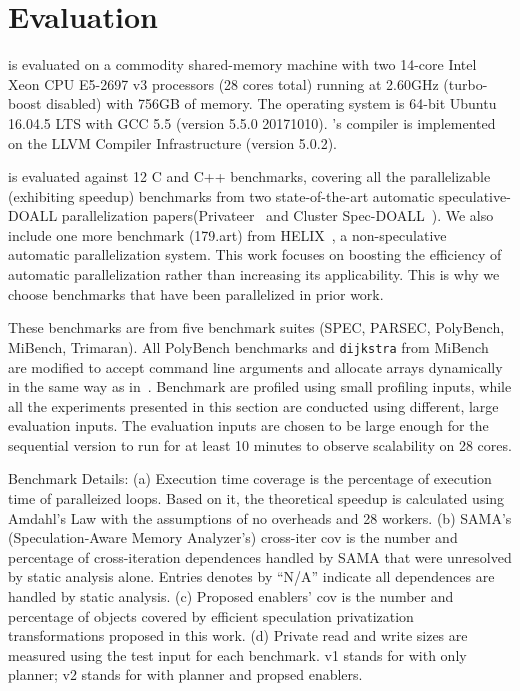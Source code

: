 \section{Evaluation}
\label{eval}
\name is evaluated on a commodity shared-memory machine with two 14-core
Intel Xeon CPU E5-2697 v3 processors (28 cores total) running at 2.60GHz
(turbo-boost disabled) with 756GB of memory. The operating system is
64-bit Ubuntu 16.04.5 LTS with GCC 5.5 (version 5.5.0 20171010).
\namensp's compiler is implemented on the LLVM Compiler Infrastructure
(version 5.0.2)\cite{LLVM:CGO04}.


\name is evaluated against 12 C and C++ benchmarks, covering all the
parallelizable (exhibiting speedup) benchmarks from two
state-of-the-art automatic speculative-DOALL parallelization
papers(Privateer~\cite{johnson:12:pldi} and Cluster
Spec-DOALL~\cite{kim:12:cgo}). We also include one more benchmark
(179.art) from HELIX~\cite{simone:12:cgo}, a non-speculative automatic
parallelization system.  This work focuses on boosting the efficiency
of automatic parallelization rather than increasing its applicability.
This is why we choose benchmarks that have been parallelized in prior
work.

These benchmarks are from five benchmark suites (SPEC\cite{},
PARSEC\cite{bienia:08:parsec}, PolyBench\cite{},
MiBench\cite{guthaus:2001:iiwsc}, Trimaran\cite{trimaran:web}). All
PolyBench benchmarks and \texttt{dijkstra} from MiBench are modified
to accept command line arguments and allocate arrays dynamically in
the same way as in~\cite{johnson:12:pldi, kim:12:cgo}.
%
%
Benchmark are profiled using small profiling inputs, while all the
experiments presented in this section are conducted using different,
large evaluation inputs. The evaluation inputs are chosen to be large
enough for the sequential version to run for at least 10 minutes to
observe scalability on 28 cores.


\begin{table}[h]
  \centering
  
  \caption{
    Benchmark Details: (a) Execution time coverage is the percentage of
  execution time of paralleized loops. Based on it, the theoretical speedup
  is calculated using Amdahl's Law with the assumptions of no overheads and
  28 workers.  (b) SAMA's (Speculation-Aware Memory Analyzer's) cross-iter
  cov is the number and percentage of cross-iteration dependences handled
  by SAMA that were unresolved by static analysis alone. Entries denotes by
  ``N/A'' indicate all dependences are handled by static analysis.  (c)
  Proposed enablers’ cov is the number and percentage of objects
  covered by efficient speculation privatization transformations proposed
  in this work. (d) Private read and write sizes are measured using the
  test input for each benchmark. v1 stands for
  \name with only planner; v2 stands for \name with
  planner and propsed enablers.}
  \label{tab:benchmark-list}
    \vspace{-5pt}
\end{table}

